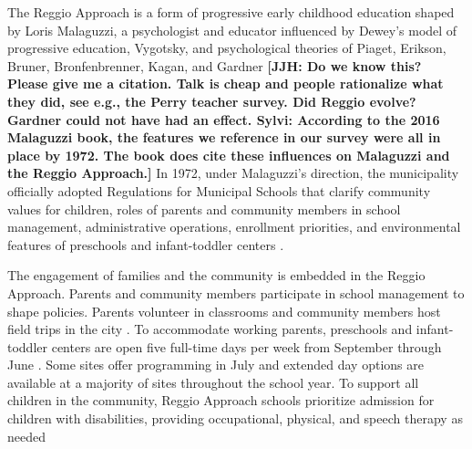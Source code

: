 The Reggio Approach is a form of progressive early childhood education shaped by Loris Malaguzzi, a psychologist and educator influenced by Dewey's model of progressive education, Vygotsky, and psychological theories of Piaget, Erikson, Bruner, Bronfenbrenner, Kagan, and Gardner \citep{Rinaldi_2006_ReggioEmilia_BOOK,Cagliari-etal-eds_2016_BOOK_Loris-Malaguzzi.} \textbf{[JJH: Do we know this? Please give me a citation. Talk is cheap and people rationalize what they did, see e.g., the Perry teacher survey. Did Reggio evolve? Gardner could not have had an effect. Sylvi: According to the 2016 Malaguzzi book, the features we reference in our survey were all in place by 1972. The book does cite these influences on Malaguzzi and the Reggio Approach.]} In 1972, under Malaguzzi's direction, the municipality officially adopted Regulations for Municipal Schools that clarify community values for children, roles of parents and community members in school management, administrative operations, enrollment priorities, and environmental features of preschools and infant-toddler centers \citep{Giaroni_1972_Regulations-Municipal-EC-Schools}.

The engagement of families and the community is embedded in the Reggio Approach. Parents and community members participate in school management to shape policies. Parents volunteer in classrooms and community members host field trips in the city \citep{CEHD_2016_Historical-Analysis,Cagliari-etal-eds_2016_BOOK_Loris-Malaguzzi}. To accommodate working parents, preschools and infant-toddler centers are open five full-time days per week from September through June \citep{Giudici-Nicolosi_2014_Reggio-Approach}. Some sites offer programming in July and extended day options are available at a majority of sites throughout the school year. To support all children in the community, Reggio Approach schools prioritize admission for children with disabilities, providing occupational, physical, and speech therapy as needed \citep{Edwards-etal-eds_1998_Hundred-Languages,Giaroni_1972_Regulations-Municipal-EC-Schools}

